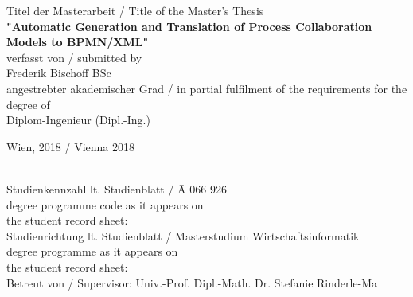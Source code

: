 \documentclass[a4paper, 11pt, oneside, BCOR1cm,toc=chapterentrywithdots]{scrbook}
\renewcommand*{\tableofcontents}{%
  	\begingroup
  	\tocsection
  	\tocfile{\contentsname}{toc}
  	\endgroup
}
\begin{document}
\begin{titlepage}
\begin{center}
\small{Titel der Masterarbeit / Title of the Master's Thesis}\\
\Large{\textbf{"Automatic Generation and Translation of Process Collaboration Models to BPMN/XML"}}\\ 
\vspace{1.5cm}
\small{verfasst von / submitted by}\\
\large{Frederik Bischoff BSc }\\
\vspace{1.5cm}
\small{angestrebter akademischer Grad / in partial fulfilment of the requirements for the degree of}\\
\large{Diplom-Ingenieur (Dipl.-Ing.)}\\
\end{center}
\vspace{1.25cm}
\small{Wien, 2018 / Vienna 2018}\\
\vspace{1.25cm}\\
\begin{tabbing}
Studienkennzahl lt. Studienblatt / \hspace{2cm} \= A 066 926\\
degree programme code as it appears on\\
the student record sheet:\\[0.5cm]
Studienrichtung lt. Studienblatt / \> Masterstudium Wirtschaftsinformatik\\
degree programme as it appears on\\
the student record sheet:\\[0.5cm]
Betreut von / Supervisor: \> Univ.-Prof. Dipl.-Math. Dr. Stefanie Rinderle-Ma\\
\end{tabbing}
\end{titlepage}


\begin{spacing}{0.95}
\tableofcontents
\end{spacing}

\makeatletter
\patchcmd{\scr@startchapter}{\if@openright\cleardoublepage\else\clearpage\fi}{}{}{}
\makeatother

\vspace{-0.4cm}
\end{document}
